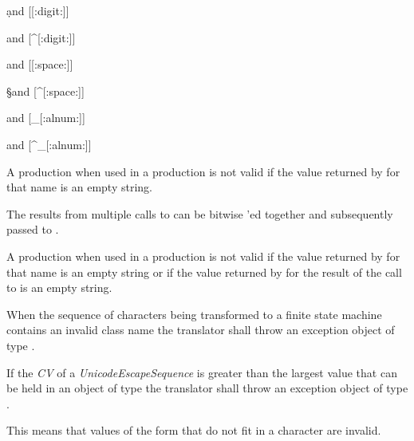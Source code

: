 \begin{codeblock}
\d and [[:digit:]]

\D and [^[:digit:]]

\s and [[:space:]]

\S and [^[:space:]]

\w and [_[:alnum:]]

\W and [^_[:alnum:]]
\end{codeblock}

\pnum
{}%
%
A  production when used in
a  production is not valid
if the value returned by  for
that name is an empty string.

\pnum
{}%
%
%
%
The results from multiple calls
to  can be bitwise 'ed
together and subsequently passed to .

\pnum
{}%
%
A  production when used in
a  production is not valid if the value
returned by  for that name is an
empty string or if the value returned by 
for the result of the call to 
is an empty string.

\pnum
{}%
When the sequence of characters being transformed to a finite state
machine contains an invalid class name the translator shall throw an
exception object of type .

\pnum
{}%
If the \textit{CV} of a \textit{UnicodeEscapeSequence} is greater than the largest
value that can be held in an object of type  the translator shall
throw an exception object of type .
\begin{note}
This means that values of the form  that do not fit in
a character are invalid.
\end{note}

